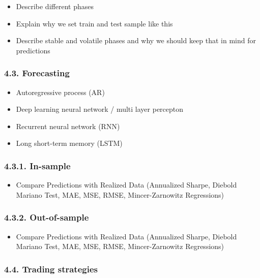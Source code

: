 \documentclass[
]{article}
\providecommand{\tightlist}{%
  \setlength{\itemsep}{0pt}\setlength{\parskip}{0pt}}
\begin{document}
\begin{itemize}
\item
  Describe different phases
\item
  Explain why we set train and test sample like this
\item
  Describe stable and volatile phases and why we should keep that in
  mind for predictions
\end{itemize}

\hypertarget{forecasting}{%
\subsubsection{4.3. Forecasting}\label{forecasting}}

\begin{itemize}
\item
  Autoregressive process (AR)
\item
  Deep learning neural network / multi layer percepton
\item
  Recurrent neural network (RNN)
\item
  Long short-term memory (LSTM)
\end{itemize}

\hypertarget{in-sample}{%
\subsubsection{4.3.1. In-sample}\label{in-sample}}

\begin{itemize}
\tightlist
\item
  Compare Predictions with Realized Data (Annualized Sharpe, Diebold
  Mariano Test, MAE, MSE, RMSE, Mincer-Zarnowitz Regressions)
\end{itemize}

\hypertarget{out-of-sample}{%
\subsubsection{4.3.2. Out-of-sample}\label{out-of-sample}}

\begin{itemize}
\tightlist
\item
  Compare Predictions with Realized Data (Annualized Sharpe, Diebold
  Mariano Test, MAE, MSE, RMSE, Mincer-Zarnowitz Regressions)
\end{itemize}

\hypertarget{trading-strategies}{%
\subsubsection{4.4. Trading strategies}\label{trading-strategies}}
\end{document}
